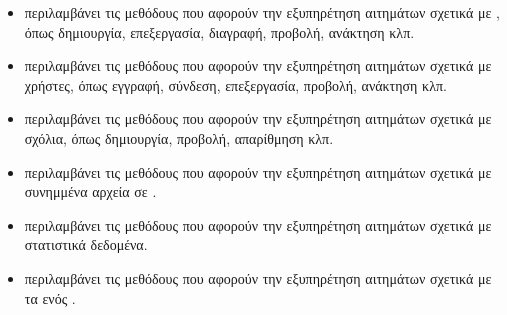 \begin{itemize}
    \item {} περιλαμβάνει τις μεθόδους που αφορούν την εξυπηρέτηση αιτημάτων σχετικά με , όπως δημιουργία, επεξεργασία, διαγραφή, προβολή, ανάκτηση κλπ.
    \item {} περιλαμβάνει τις μεθόδους που αφορούν την εξυπηρέτηση αιτημάτων σχετικά με χρήστες, όπως εγγραφή, σύνδεση, επεξεργασία, προβολή, ανάκτηση κλπ.
    \item {} περιλαμβάνει τις μεθόδους που αφορούν την εξυπηρέτηση αιτημάτων σχετικά με σχόλια, όπως δημιουργία, προβολή, απαρίθμηση κλπ.
    \item {} περιλαμβάνει τις μεθόδους που αφορούν την εξυπηρέτηση αιτημάτων σχετικά με συνημμένα αρχεία σε .
    \item {} περιλαμβάνει τις μεθόδους που αφορούν την εξυπηρέτηση αιτημάτων σχετικά με στατιστικά δεδομένα.
    \item {} περιλαμβάνει τις μεθόδους που αφορούν την εξυπηρέτηση αιτημάτων σχετικά με τα  ενός .
\end{itemize}







